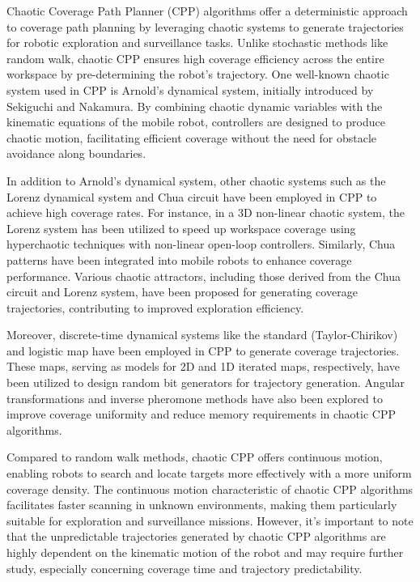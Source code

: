 Chaotic Coverage Path Planner (CPP) algorithms offer a deterministic approach to coverage path planning by leveraging chaotic systems to generate trajectories for robotic exploration and surveillance tasks. Unlike stochastic methods like random walk, chaotic CPP ensures high coverage efficiency across the entire workspace by pre-determining the robot's trajectory. One well-known chaotic system used in CPP is Arnold's dynamical system, initially introduced by Sekiguchi and Nakamura. By combining chaotic dynamic variables with the kinematic equations of the mobile robot, controllers are designed to produce chaotic motion, facilitating efficient coverage without the need for obstacle avoidance along boundaries.

\vspace*{6mm}

In addition to Arnold's dynamical system, other chaotic systems such as the Lorenz dynamical system and Chua circuit have been employed in CPP to achieve high coverage rates. For instance, in a 3D non-linear chaotic system, the Lorenz system has been utilized to speed up workspace coverage using hyperchaotic techniques with non-linear open-loop controllers. Similarly, Chua patterns have been integrated into mobile robots to enhance coverage performance. Various chaotic attractors, including those derived from the Chua circuit and Lorenz system, have been proposed for generating coverage trajectories, contributing to improved exploration efficiency.

\vspace*{6mm}

Moreover, discrete-time dynamical systems like the standard (Taylor-Chirikov) and logistic map have been employed in CPP to generate coverage trajectories. These maps, serving as models for 2D and 1D iterated maps, respectively, have been utilized to design random bit generators for trajectory generation. Angular transformations and inverse pheromone methods have also been explored to improve coverage uniformity and reduce memory requirements in chaotic CPP algorithms.

\vspace*{6mm}

Compared to random walk methods, chaotic CPP offers continuous motion, enabling robots to search and locate targets more effectively with a more uniform coverage density. The continuous motion characteristic of chaotic CPP algorithms facilitates faster scanning in unknown environments, making them particularly suitable for exploration and surveillance missions. However, it's important to note that the unpredictable trajectories generated by chaotic CPP algorithms are highly dependent on the kinematic motion of the robot and may require further study, especially concerning coverage time and trajectory predictability.

